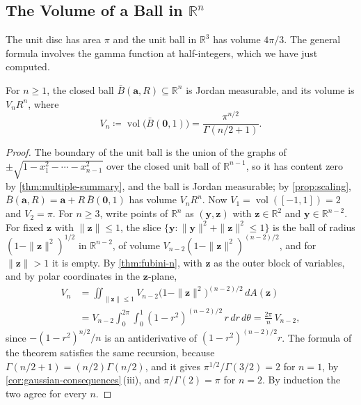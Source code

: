 \subsection{The Volume of a Ball in \texorpdfstring{$\mathbb R^n$}{R\^{}n}}

The unit disc has area $\pi$ and the unit ball in $\mathbb R^3$ has volume $4\pi/3$. The general formula involves the gamma function at half-integers, which we have just computed.

\begin{theorem}
\label{thm:ball-volume}
For $n\ge1$, the closed ball $\bar B(\mathbf a,R)\subseteq\mathbb R^n$ is Jordan measurable, and its volume is $V_nR^n$, where
\[
V_n\coloneqq\operatorname{vol}\bigl(\bar B(\mathbf 0,1)\bigr)=\frac{\pi^{n/2}}{\Gamma(n/2+1)} .
\]
\end{theorem}

\begin{proof}
The boundary of the unit ball is the union of the graphs of $\pm\sqrt{1-x_1^2-\cdots-x_{n-1}^2}$ over the closed unit ball of $\mathbb R^{n-1}$, so it has content zero by \cref{thm:multiple-summary}, and the ball is Jordan measurable; by \cref{prop:scaling}, $\bar B(\mathbf a,R)=\mathbf a+R\,\bar B(\mathbf 0,1)$ has volume $V_nR^n$. Now $V_1=\operatorname{vol}([-1,1])=2$ and $V_2=\pi$. For $n\ge3$, write points of $\mathbb R^n$ as $(\mathbf y,\mathbf z)$ with $\mathbf z\in\mathbb R^2$ and $\mathbf y\in\mathbb R^{n-2}$. For fixed $\mathbf z$ with $\|\mathbf z\|\le1$, the slice $\{\mathbf y: \|\mathbf y\|^2+\|\mathbf z\|^2\le1\}$ is the ball of radius $(1-\|\mathbf z\|^2)^{1/2}$ in $\mathbb R^{n-2}$, of volume $V_{n-2}(1-\|\mathbf z\|^2)^{(n-2)/2}$, and for $\|\mathbf z\|>1$ it is empty. By \cref{thm:fubini-n}, with $\mathbf z$ as the outer block of variables, and by polar coordinates in the $\mathbf z$-plane,
\[
\begin{aligned}
V_n&=\iint_{\|\mathbf z\|\le1}V_{n-2}\bigl(1-\|\mathbf z\|^2\bigr)^{(n-2)/2}\,dA(\mathbf z)\\
&=V_{n-2}\int_0^{2\pi}\int_0^1(1-r^2)^{(n-2)/2}\,r\,dr\,d\theta=\frac{2\pi}n\,V_{n-2},
\end{aligned}
\]
since $-(1-r^2)^{n/2}/n$ is an antiderivative of $(1-r^2)^{(n-2)/2}r$. The formula of the theorem satisfies the same recursion, because $\Gamma(n/2+1)=(n/2)\Gamma(n/2)$, and it gives $\pi^{1/2}/\Gamma(3/2)=2$ for $n=1$, by \cref{cor:gaussian-consequences}\,(iii), and $\pi/\Gamma(2)=\pi$ for $n=2$. By induction the two agree for every $n$.
\end{proof}

